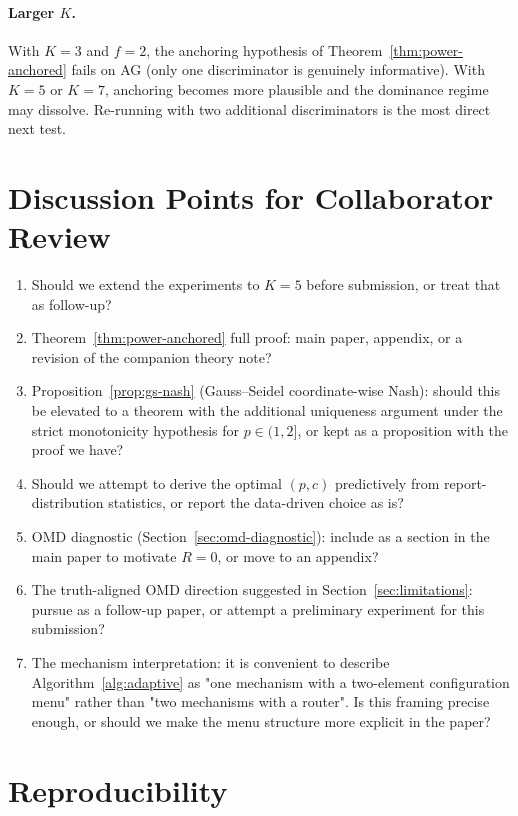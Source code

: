 \documentclass[11pt]{article}
\begin{document}
\paragraph{Larger $K$.}
With $K = 3$ and $f = 2$, the anchoring hypothesis of
Theorem~\ref{thm:power-anchored} fails on AG (only one discriminator
is genuinely informative). With $K = 5$ or $K = 7$, anchoring becomes
more plausible and the dominance regime may dissolve. Re-running with
two additional discriminators is the most direct next test.

\section{Discussion Points for Collaborator Review}

\begin{enumerate}[leftmargin=*]
\item Should we extend the experiments to $K = 5$ before submission, or
treat that as follow-up?
\item Theorem~\ref{thm:power-anchored} full proof: main paper, appendix,
or a revision of the companion theory note?
\item Proposition~\ref{prop:gs-nash} (Gauss--Seidel coordinate-wise Nash):
should this be elevated to a theorem with the additional uniqueness
argument under the strict monotonicity hypothesis for $p \in (1, 2]$, or
kept as a proposition with the proof we have?
\item Should we attempt to derive the optimal $(p, c)$ predictively from
report-distribution statistics, or report the data-driven choice as is?
\item OMD diagnostic (Section~\ref{sec:omd-diagnostic}): include as a
section in the main paper to motivate $R = 0$, or move to an appendix?
\item The truth-aligned OMD direction suggested in
Section~\ref{sec:limitations}: pursue as a follow-up paper, or attempt a
preliminary experiment for this submission?
\item The mechanism interpretation: it is convenient to describe
Algorithm~\ref{alg:adaptive} as "one mechanism with a two-element
configuration menu" rather than "two mechanisms with a router". Is this
framing precise enough, or should we make the menu structure more
explicit in the paper?
\end{enumerate}

\appendix

\section{Reproducibility}
\end{document}
